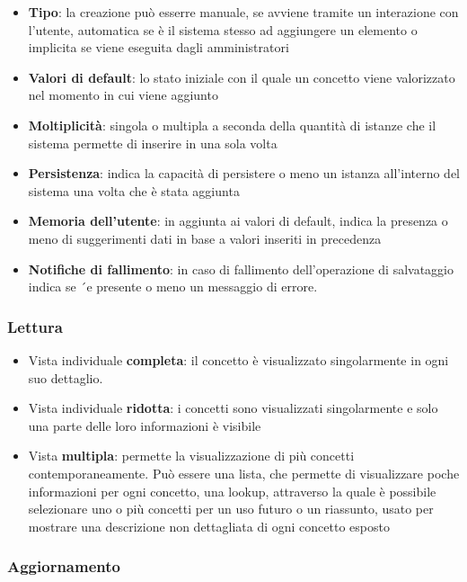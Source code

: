 \documentclass[12pt,italian,]{report}
\providecommand{\tightlist}{%
  \setlength{\itemsep}{0pt}\setlength{\parskip}{0pt}}
\begin{document}
\begin{itemize}
\tightlist
\item
  \textbf{Tipo}: la creazione può esserre manuale, se avviene tramite un
  interazione con l'utente, automatica se è il sistema stesso ad
  aggiungere un elemento o implicita se viene eseguita dagli
  amministratori
\item
  \textbf{Valori di default}: lo stato iniziale con il quale un concetto
  viene valorizzato nel momento in cui viene aggiunto
\item
  \textbf{Moltiplicità}: singola o multipla a seconda della quantità di
  istanze che il sistema permette di inserire in una sola volta
\item
  \textbf{Persistenza}: indica la capacità di persistere o meno un
  istanza all'interno del sistema una volta che è stata aggiunta
\item
  \textbf{Memoria dell'utente}: in aggiunta ai valori di default, indica
  la presenza o meno di suggerimenti dati in base a valori inseriti in
  precedenza
\item
  \textbf{Notifiche di fallimento}: in caso di fallimento
  dell'operazione di salvataggio indica se ´e presente o meno un
  messaggio di errore.
\end{itemize}

\hypertarget{lettura}{%
\subsubsection{Lettura}\label{lettura}}

\begin{itemize}
\tightlist
\item
  Vista individuale \textbf{completa}: il concetto è visualizzato
  singolarmente in ogni suo dettaglio.
\item
  Vista individuale \textbf{ridotta}: i concetti sono visualizzati
  singolarmente e solo una parte delle loro informazioni è visibile
\item
  Vista \textbf{multipla}: permette la visualizzazione di più concetti
  contemporaneamente. Può essere una lista, che permette di visualizzare
  poche informazioni per ogni concetto, una lookup, attraverso la quale
  è possibile selezionare uno o più concetti per un uso futuro o un
  riassunto, usato per mostrare una descrizione non dettagliata di ogni
  concetto esposto
\end{itemize}

\hypertarget{aggiornamento}{%
\subsubsection{Aggiornamento}\label{aggiornamento}}
\end{document}
